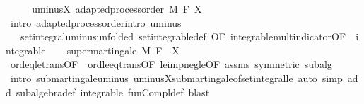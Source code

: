 \begin{isabellebody}
%
\isadelimproof
%
\endisadelimproof
%
\isatagproof
{}\isamarkupfalse%
\ {\isacharminus}{\kern0pt}\isanewline
\ \ \isamarkupfalse%
\ uminus{\isacharunderscore}{\kern0pt}X{\isacharcolon}{\kern0pt}\ adapted{\isacharunderscore}{\kern0pt}process{\isacharunderscore}{\kern0pt}order\ M\ F\ {\isachardoublequoteopen}{\isacharminus}{\kern0pt}X{\isachardoublequoteclose}\ \isamarkupfalse%
\ {\isacharparenleft}{\kern0pt}intro\ adapted{\isacharunderscore}{\kern0pt}process{\isacharunderscore}{\kern0pt}order{\isachardot}{\kern0pt}intro\ uminus{\isacharparenright}{\kern0pt}\isanewline
\ \ \isamarkupfalse%
\ {\isacharasterisk}{\kern0pt}\ {\isacharequal}{\kern0pt}\ set{\isacharunderscore}{\kern0pt}integral{\isacharunderscore}{\kern0pt}uminus{\isacharbrackleft}{\kern0pt}unfolded\ set{\isacharunderscore}{\kern0pt}integrable{\isacharunderscore}{\kern0pt}def{\isacharcomma}{\kern0pt}\ OF\ integrable{\isacharunderscore}{\kern0pt}mult{\isacharunderscore}{\kern0pt}indicator{\isacharbrackleft}{\kern0pt}OF\ {\isacharunderscore}{\kern0pt}\ integrable{\isacharbrackright}{\kern0pt}{\isacharbrackright}{\kern0pt}\isanewline
\ \ \isamarkupfalse%
\ {\isachardoublequoteopen}supermartingale\ M\ F\ {\isacharparenleft}{\kern0pt}{\isacharminus}{\kern0pt}{\isacharparenleft}{\kern0pt}{\isacharminus}{\kern0pt}\ X{\isacharparenright}{\kern0pt}{\isacharparenright}{\kern0pt}{\isachardoublequoteclose}\ \isamarkupfalse%
\ ord{\isacharunderscore}{\kern0pt}eq{\isacharunderscore}{\kern0pt}le{\isacharunderscore}{\kern0pt}trans{\isacharbrackleft}{\kern0pt}OF\ {\isacharasterisk}{\kern0pt}\ ord{\isacharunderscore}{\kern0pt}le{\isacharunderscore}{\kern0pt}eq{\isacharunderscore}{\kern0pt}trans{\isacharbrackleft}{\kern0pt}OF\ le{\isacharunderscore}{\kern0pt}imp{\isacharunderscore}{\kern0pt}neg{\isacharunderscore}{\kern0pt}le{\isacharbrackleft}{\kern0pt}OF\ assms{\isacharparenleft}{\kern0pt}{}{\isacharparenright}{\kern0pt}{\isacharbrackright}{\kern0pt}\ {\isacharasterisk}{\kern0pt}{\isacharbrackleft}{\kern0pt}symmetric{\isacharbrackright}{\kern0pt}{\isacharbrackright}{\kern0pt}{\isacharbrackright}{\kern0pt}\ subalg\isanewline
\ \ \ \ \isamarkupfalse%
\ {\isacharparenleft}{\kern0pt}intro\ submartingale{\isachardot}{\kern0pt}uminus\ uminus{\isacharunderscore}{\kern0pt}X{\isachardot}{\kern0pt}submartingale{\isacharunderscore}{\kern0pt}of{\isacharunderscore}{\kern0pt}set{\isacharunderscore}{\kern0pt}integral{\isacharunderscore}{\kern0pt}le{\isacharparenright}{\kern0pt}\ {\isacharparenleft}{\kern0pt}auto\ simp\ add{\isacharcolon}{\kern0pt}\ subalgebra{\isacharunderscore}{\kern0pt}def\ integrable\ fun{\isacharunderscore}{\kern0pt}Compl{\isacharunderscore}{\kern0pt}def{\isacharcomma}{\kern0pt}\ blast{\isacharparenright}{\kern0pt}\isanewline

\end{isabellebody}
